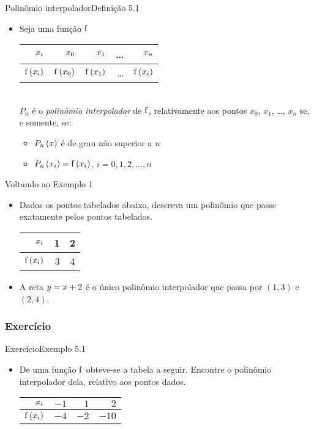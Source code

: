 \begin{frame}{Polinômio interpolador}{Definição 5.1}
\begin{itemize}
  \item Seja uma função $\mathrm{f}$\\ 
\begin{tabular}{r|rrrr}
\bfseries $x_i$ & \hspace{0.3cm} $x_0$ & \hspace{0.3cm} $x_1$ & \hspace{0.3cm} \ldots & \hspace{0.3cm} $x_n$ \\
\hline
\bfseries $\mathrm{f}\left(x_i\right)$ & $\mathrm{f}\left(x_0\right)$ & $\mathrm{f}\left(x_1\right)$ & \ldots & $\mathrm{f}\left(x_i\right)$ 
\end{tabular}
\\  
%
$P_n$ é o \emph{polinômio interpolador} de $\mathrm{f}$, relativamente aos pontos $x_0$, $x_1$, \ldots, $x_n$ se, e somente, se:
  \begin{itemize}
    \item $P_n\left(x\right)$ é de grau não superior a $n$
    \item $P_n\left(x_i\right) = \mathrm{f}\left(x_i\right)$, $i = 0, 1, 2, \ldots, n$
  \end{itemize}
\end{itemize}
\end{frame}

\begin{frame}{Voltando ao Exemplo 1}
\begin{itemize}
  \item Dados os pontos tabelados abaixo, descreva um polinômio que passe exatamente pelos pontos tabelados.\\
\begin{tabular}{r|rr}
\bfseries $x_i$ & \hspace{0.2cm} 1 & \hspace{0.2cm} 2\\
\hline
\bfseries $\mathrm{f}\left(x_i\right)$ & 3 & 4 \\
\end{tabular}
  \item A reta $y = x + 2$ é o único polinômio interpolador que passa por $(1,3)$ e $(2,4)$.
\end{itemize}
\end{frame}

\subsubsection{Exercício}
\begin{frame}{Exercício}{Exemplo 5.1}
\begin{itemize}
  \item De uma função $\mathrm{f}$ obteve-se a tabela  a seguir. Encontre o polinômio interpolador dela, relativo aos pontos dados.\\
\begin{tabular}{r|rrr}
$x_i$ & $-1$ & $1$ & $2$\\
\hline
$\mathrm{f}\left(x_i\right)$ & $-4$ & $-2$ & $-10$
\end{tabular}
\end{itemize}
\end{frame}

